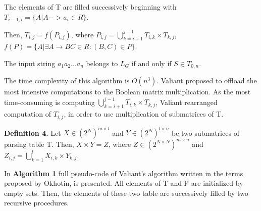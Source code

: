 \documentclass{article}
\begin{document}
  The elements of T are filled successively beginning with $T_{i - 1, i} = \{ A | A -> a_{i} \in R\}$. 
  
  Then, $T_{i, j} = f(P_{i, j})$, where $P_{i, j} = \bigcup\limits_{k = i + 1}^{j - 1} T_{i,k} \times T_{k, j}$, $f(P) = \{A | \exists A \rightarrow BC \in R : (B, C) \in P\}$.
  
  The input string $a_{1}a_{2}...a_{n}$ belongs to $L_{G}$ if and only if $S \in T_{0, n}$.
  
  The time complexity of this algorithm is $O(n^3)$. Valiant proposed to offload the most intensive computations to the Boolean matrix multiplication. As the most time-consuming is computing $\bigcup\limits_{k = i + 1}^{j - 1} T_{i, k} \times T_{k, j}$, Valiant rearranged computation of $T_{i, j}$, in order to use multiplication of submatrices of T. 
  
  \textbf{Definition 4.} Let $X \in (2^N)^{m \times l}$ and $Y \in (2^N)^{l \times n}$ be two submatrices of parsing table T. Then, $X \times Y = Z$, where $Z \in (2^{N \times N})^{m \times n}$ and $Z_{i, j} = \bigcup\limits_{k = 1}^{l} X_{i, k} \times Y_{k, j}$.
  
  In \textbf{Algorithm 1} full pseudo-code of Valiant's algorithm written in the terms proposed by Okhotin, is presented. All elements of T and P are initialized by empty sets. Then, the elements of these two table are successively filled by two recursive procedures.
  
\end{document}

